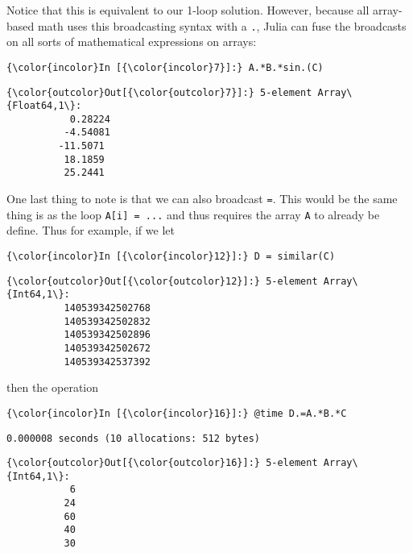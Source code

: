 \documentclass[11pt]{article}
\begin{document}
    Notice that this is equivalent to our 1-loop solution. However, because
all array-based math uses this broadcasting syntax with a \texttt{.},
Julia can fuse the broadcasts on all sorts of mathematical expressions
on arrays:

    \begin{Verbatim}[commandchars=\\\{\}]
{\color{incolor}In [{\color{incolor}7}]:} A.*B.*sin.(C)
\end{Verbatim}

            \begin{Verbatim}[commandchars=\\\{\}]
{\color{outcolor}Out[{\color{outcolor}7}]:} 5-element Array\{Float64,1\}:
           0.28224
          -4.54081
         -11.5071 
          18.1859 
          25.2441 
\end{Verbatim}
        
    One last thing to note is that we can also broadcast \texttt{=}. This
would be the same thing is as the loop \texttt{A{[}i{]} = ...} and thus
requires the array \texttt{A} to already be define. Thus for example, if
we let

    \begin{Verbatim}[commandchars=\\\{\}]
{\color{incolor}In [{\color{incolor}12}]:} D = similar(C)
\end{Verbatim}

            \begin{Verbatim}[commandchars=\\\{\}]
{\color{outcolor}Out[{\color{outcolor}12}]:} 5-element Array\{Int64,1\}:
          140539342502768
          140539342502832
          140539342502896
          140539342502672
          140539342537392
\end{Verbatim}
        
    then the operation

    \begin{Verbatim}[commandchars=\\\{\}]
{\color{incolor}In [{\color{incolor}16}]:} @time D.=A.*B.*C
\end{Verbatim}

    \begin{Verbatim}[commandchars=\\\{\}]
  0.000008 seconds (10 allocations: 512 bytes)

    \end{Verbatim}

            \begin{Verbatim}[commandchars=\\\{\}]
{\color{outcolor}Out[{\color{outcolor}16}]:} 5-element Array\{Int64,1\}:
           6
          24
          60
          40
          30
\end{Verbatim}
        
\end{document}

